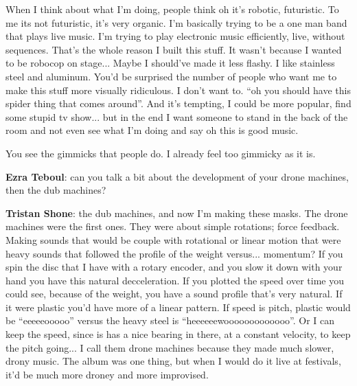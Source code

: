 When I think about what I'm doing, people think oh it's robotic, futuristic. To me its not futuristic, it's very organic. I'm basically trying to be a one man band that plays live music. I'm trying to play electronic music efficiently, live, without sequences. That's the whole reason I built this stuff. It wasn't because I wanted to be robocop on stage... Maybe I should've made it less flashy. I like stainless steel and aluminum. You'd be surprised the number of people who want me to make this stuff more visually ridiculous. I don't want to. ``oh you should have this spider thing that comes around''. And it's tempting, I could be more popular, find some stupid tv show... but in the end I want someone to stand in the back of the room and not even see what I'm doing and say oh this is good music. 

You see the gimmicks that people do. I already feel too gimmicky as it is. 

\textbf{Ezra Teboul}: can you talk a bit about the development of your drone machines, then the dub machines? 

\textbf{Tristan Shone}: the dub machines, and now I'm making these masks. The drone machines were the first ones. They were about simple rotations; force feedback. Making sounds that would be couple with rotational or linear motion that were heavy sounds that followed the profile of the weight versus... momentum? If you spin the disc that I have with a rotary encoder, and you slow it down with your hand you have this natural decceleration. If you plotted the speed over time you could see, because of the weight, you have a sound profile that's very natural. If it were plastic you'd have more of a linear pattern. If speed is pitch, plastic would be ``eeeeeooooo'' versus the heavy steel is ``heeeeeewooooooooooooo''. Or I can keep the speed, since is has a nice bearing in there, at a constant velocity, to keep the pitch going... I call them drone machines because they made much slower, drony music. The album was one thing, but when I would do it live at festivals, it'd be much more droney and more improvised. 

